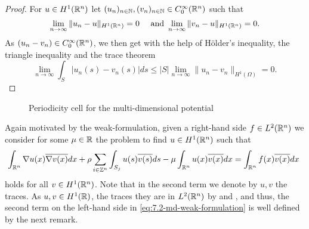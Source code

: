 \begin{proof}
	For $u \in H^{1}(\mathbb{R}^{n})$ let $(u_{n})_{n \in \mathbb{N}}, (v_{n})_{n \in \mathbb{N}} \in C_{0}^{\infty}(\mathbb{R}^{n})$ such that
	\[ \lim_{n \rightarrow \infty} \| u_{n} - u \|_{H^{1}(\mathbb{R}^{n})} = 0 \quad \text{ and } \lim_{n \rightarrow \infty} \| v_{n} - u\|_{H^{1}(\mathbb{R}^{n})} = 0.  \]
	As $(u_{n} - v_{n}) \in C_{0}^{\infty}(\mathbb{R}^{n})$, we then get with the help of Hölder's inequality, the triangle inequality and the trace theorem
	\[ \lim_{n \rightarrow \infty} \int_{S} \left| u_{n}(s) - v_{n}(s) \right| ds \leq |S| \lim_{n \rightarrow \infty} \| u_{n} - v_{n} \|_{H^{1}(\Omega)} = 0. \] 
\end{proof}

\begin{figure}[!ht] \centering
	\caption{Periodicity cell for the multi-dimensional potential} \label{fig:md-cell}  \label{fig:7.1}
\end{figure}

Again motivated by the weak-formulation, given a right-hand side $f \in L^{2}(\mathbb{R}^{n})$ we consider for some	 $\mu \in \mathbb{R}$ the problem to find $u \in H^{1}(\mathbb{R}^{n})$ such that
	\begin{equation}
		\int_{\R^{n}} \nabla u(x) \overline{\nabla v(x)} dx + \rho \sum_{i \in \Z^{n}} \int_{S_{j}} u(s) \overline{v(s)} ds - \mu \int_{\R^{n}} u(x) \overline{v(x)} dx = \int_{\R^{n}} f(x) \overline{v(x)} dx \label{eq:7.2-md-weak-formulation}
	\end{equation} 
holds for all $v \in H^{1}(\mathbb{R}^{n})$. Note that in the second term we denote by $u, v$ the traces. As $u, v \in H^{1}(\mathbb{R})$, the traces they are in $L^{2}(\mathbb{R}^{n})$ by \cite[p. 251, Theorem 5.1]{evans1998partial} and \cite[p. 164]{adams2003sobolev}, and thus, the second term on the left-hand side in \eqref{eq:7.2-md-weak-formulation} is well defined by the next remark.

